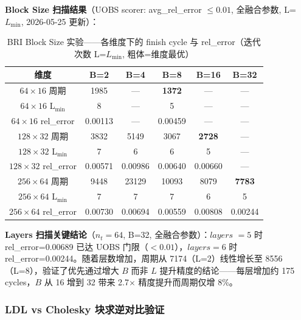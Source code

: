     \textbf{Block Size 扫描结果}（UOBS scorer: avg\_rel\_error $\leq0.01$, 全融合参数,
    L=$L_{\min}$, 2026-05-25 更新）：

    \begin{table}[H]
        \centering
        \caption{BRI Block Size 实验——各维度下的 finish cycle 与 rel\_error（迭代次数
        L=$L_{\min}$, 粗体=维度最优）}
        \label{tab:bri-blocksize-extreme}
        \begin{tabular}{c c c c c c}
            \toprule 维度               & B=2     & B=4     & B=8           & B=16          & B=32          \\
            \midrule $64\times16$ 周期  & 1985    & —       & \textbf{1372} & —             & —             \\
            $64\times16$ L$_{\min}$   & 8       & —       & 5             & —             & —             \\
            $64\times16$ rel\_error   & 0.00113 & —       & 0.00459       & —             & —             \\
            \midrule $128\times32$ 周期 & 3832    & 5149    & 3067          & \textbf{2728} & —             \\
            $128\times32$ L$_{\min}$  & 7       & 6       & 6             & 5             & —             \\
            $128\times32$ rel\_error  & 0.00571 & 0.00986 & 0.00640       & 0.00660       & —             \\
            \midrule $256\times64$ 周期 & 9448    & 23129   & 10093         & 8079          & \textbf{7783} \\
            $256\times64$ L$_{\min}$  & 7       & 7       & 7             & 6             & 5             \\
            $256\times64$ rel\_error  & 0.00730 & 0.00694 & 0.00559       & 0.00808       & 0.00244       \\
            \bottomrule
        \end{tabular}
    \end{table}

    \textbf{Layers 扫描关键结论}（$n_{t}=64$, B=32, 全融合参数）：$\textit{layers
    }=5$ 时 rel\_error=0.00689 已达 UOBS 门限（$<0.01$），$\textit{layers}=6$ 时
    rel\_error=0.00244。随着层数增加，周期从 7174（L=2）线性增长至 8556（L=8），验证了优先通过增大
    $B$ 而非 $L$ 提升精度的结论——每层增加约 175 cycles，$B$ 从 16 增到 32 带来
    2.7$\times$ 精度提升而周期仅增 8\%。

    \subsubsection{LDL vs Cholesky 块求逆对比验证}

